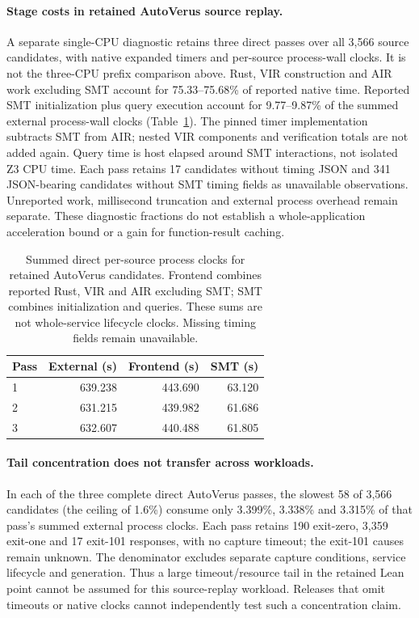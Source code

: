 \documentclass[10pt,twocolumn]{article}
\begin{document}
\paragraph{Stage costs in retained AutoVerus source replay.}
A separate single-CPU diagnostic retains three direct passes over all 3,566
source candidates, with native expanded timers and per-source process-wall
clocks. It is not the three-CPU prefix comparison above.
Rust, VIR construction and AIR work excluding SMT account for
75.33--75.68\% of reported native time. Reported SMT initialization plus query
execution account for 9.77--9.87\% of the summed external process-wall clocks
(Table~\ref{tab:autoverus-stage-costs}). The pinned timer implementation
subtracts SMT from AIR; nested VIR components and verification totals are not
added again. Query time is host elapsed around SMT interactions, not isolated
Z3 CPU time. Each pass retains 17 candidates without timing JSON and 341
JSON-bearing candidates without SMT timing fields as unavailable observations.
Unreported work, millisecond truncation and external process overhead remain
separate. These diagnostic fractions do not establish a whole-application
acceleration bound or a gain for function-result caching.

\begin{table}[t]
\centering
\small
\begin{tabular}{@{}lrrr@{}}
\toprule
Pass & External (s) & Frontend (s) & SMT (s) \\
\midrule
1 & 639.238 & 443.690 & 63.120 \\
2 & 631.215 & 439.982 & 61.686 \\
3 & 632.607 & 440.488 & 61.805 \\
\bottomrule
\end{tabular}
\caption{Summed direct per-source process clocks for retained AutoVerus
candidates. Frontend combines reported Rust, VIR and AIR excluding SMT;
SMT combines initialization and queries. These sums are not whole-service
lifecycle clocks. Missing timing fields remain unavailable.}
\label{tab:autoverus-stage-costs}
\end{table}

\paragraph{Tail concentration does not transfer across workloads.}
In each of the three complete direct AutoVerus passes, the slowest
58 of 3,566 candidates (the ceiling of 1.6\%) consume only
3.399\%, 3.338\% and 3.315\% of that pass's summed external process clocks.
Each pass retains 190 exit-zero, 3,359 exit-one and 17 exit-101 responses,
with no capture timeout; the exit-101 causes remain unknown.
The denominator excludes separate capture conditions, service lifecycle and
generation. Thus a large timeout/resource tail in the retained Lean point
cannot be assumed for this source-replay workload. Releases that omit
timeouts or native clocks cannot independently test such a concentration claim.
\end{document}
